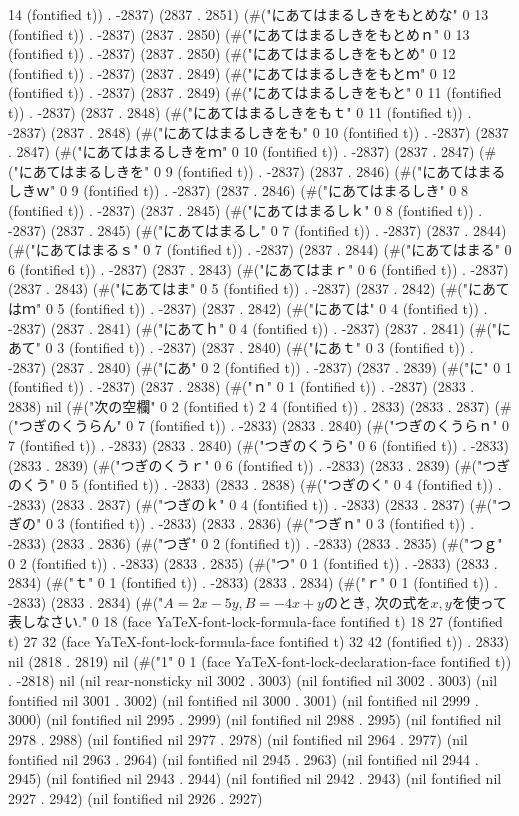 14 (fontified t)) . -2837) (2837 . 2851) (#("にあてはまるしきをもとめな" 0 13 (fontified t)) . -2837) (2837 . 2850) (#("にあてはまるしきをもとめｎ" 0 13 (fontified t)) . -2837) (2837 . 2850) (#("にあてはまるしきをもとめ" 0 12 (fontified t)) . -2837) (2837 . 2849) (#("にあてはまるしきをもとｍ" 0 12 (fontified t)) . -2837) (2837 . 2849) (#("にあてはまるしきをもと" 0 11 (fontified t)) . -2837) (2837 . 2848) (#("にあてはまるしきをもｔ" 0 11 (fontified t)) . -2837) (2837 . 2848) (#("にあてはまるしきをも" 0 10 (fontified t)) . -2837) (2837 . 2847) (#("にあてはまるしきをｍ" 0 10 (fontified t)) . -2837) (2837 . 2847) (#("にあてはまるしきを" 0 9 (fontified t)) . -2837) (2837 . 2846) (#("にあてはまるしきｗ" 0 9 (fontified t)) . -2837) (2837 . 2846) (#("にあてはまるしき" 0 8 (fontified t)) . -2837) (2837 . 2845) (#("にあてはまるしｋ" 0 8 (fontified t)) . -2837) (2837 . 2845) (#("にあてはまるし" 0 7 (fontified t)) . -2837) (2837 . 2844) (#("にあてはまるｓ" 0 7 (fontified t)) . -2837) (2837 . 2844) (#("にあてはまる" 0 6 (fontified t)) . -2837) (2837 . 2843) (#("にあてはまｒ" 0 6 (fontified t)) . -2837) (2837 . 2843) (#("にあてはま" 0 5 (fontified t)) . -2837) (2837 . 2842) (#("にあてはｍ" 0 5 (fontified t)) . -2837) (2837 . 2842) (#("にあては" 0 4 (fontified t)) . -2837) (2837 . 2841) (#("にあてｈ" 0 4 (fontified t)) . -2837) (2837 . 2841) (#("にあて" 0 3 (fontified t)) . -2837) (2837 . 2840) (#("にあｔ" 0 3 (fontified t)) . -2837) (2837 . 2840) (#("にあ" 0 2 (fontified t)) . -2837) (2837 . 2839) (#("に" 0 1 (fontified t)) . -2837) (2837 . 2838) (#("ｎ" 0 1 (fontified t)) . -2837) (2833 . 2838) nil (#("次の空欄" 0 2 (fontified t) 2 4 (fontified t)) . 2833) (2833 . 2837) (#("つぎのくうらん" 0 7 (fontified t)) . -2833) (2833 . 2840) (#("つぎのくうらｎ" 0 7 (fontified t)) . -2833) (2833 . 2840) (#("つぎのくうら" 0 6 (fontified t)) . -2833) (2833 . 2839) (#("つぎのくうｒ" 0 6 (fontified t)) . -2833) (2833 . 2839) (#("つぎのくう" 0 5 (fontified t)) . -2833) (2833 . 2838) (#("つぎのく" 0 4 (fontified t)) . -2833) (2833 . 2837) (#("つぎのｋ" 0 4 (fontified t)) . -2833) (2833 . 2837) (#("つぎの" 0 3 (fontified t)) . -2833) (2833 . 2836) (#("つぎｎ" 0 3 (fontified t)) . -2833) (2833 . 2836) (#("つぎ" 0 2 (fontified t)) . -2833) (2833 . 2835) (#("つｇ" 0 2 (fontified t)) . -2833) (2833 . 2835) (#("つ" 0 1 (fontified t)) . -2833) (2833 . 2834) (#("ｔ" 0 1 (fontified t)) . -2833) (2833 . 2834) (#("ｒ" 0 1 (fontified t)) . -2833) (2833 . 2834) (#("$A=2x-5y, B=-4x+y$のとき, 次の式を$x,y$を使って表しなさい." 0 18 (face YaTeX-font-lock-formula-face fontified t) 18 27 (fontified t) 27 32 (face YaTeX-font-lock-formula-face fontified t) 32 42 (fontified t)) . 2833) nil (2818 . 2819) nil (#("1" 0 1 (face YaTeX-font-lock-declaration-face fontified t)) . -2818) nil (nil rear-nonsticky nil 3002 . 3003) (nil fontified nil 3002 . 3003) (nil fontified nil 3001 . 3002) (nil fontified nil 3000 . 3001) (nil fontified nil 2999 . 3000) (nil fontified nil 2995 . 2999) (nil fontified nil 2988 . 2995) (nil fontified nil 2978 . 2988) (nil fontified nil 2977 . 2978) (nil fontified nil 2964 . 2977) (nil fontified nil 2963 . 2964) (nil fontified nil 2945 . 2963) (nil fontified nil 2944 . 2945) (nil fontified nil 2943 . 2944) (nil fontified nil 2942 . 2943) (nil fontified nil 2927 . 2942) (nil fontified nil 2926 . 2927) 